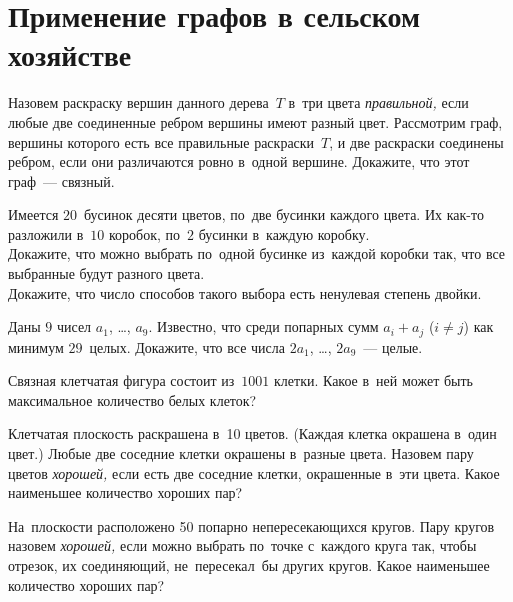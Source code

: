 
\section*{Применение графов в сельском хозяйстве}


\begin{problems}

\item
Назовем раскраску вершин данного дерева~$T$ в~три цвета \emph{правильной,}
если любые две соединенные ребром вершины имеют разный цвет.
Рассмотрим граф, вершины которого есть все правильные раскраски~$T$, и две
раскраски соединены ребром, если они различаются ровно в~одной вершине.
Докажите, что этот граф~--- связный.

\item
Имеется $20$~бусинок десяти цветов, по~две бусинки каждого цвета.
Их как-то разложили в~$10$ коробок, по~$2$ бусинки в~каждую коробку.
\\
\subproblem
Докажите, что можно выбрать по~одной бусинке из~каждой коробки так, что все
выбранные будут разного цвета.
\\
\subproblem
Докажите, что число способов такого выбора есть ненулевая степень двойки.

\item
Даны $9$ чисел $a_{1}$, \ldots, $a_{9}$.
Известно, что среди попарных сумм $a_{i} + a_{j}$ ($i \neq j$) как минимум
$29$~целых.
Докажите, что все числа $2 a_{1}$, \ldots, $2 a_{9}$~--- целые.

\item
Связная клетчатая фигура состоит из~$1001$ клетки.
Какое в~ней может быть максимальное количество белых клеток?

\item
Клетчатая плоскость раскрашена в~10 цветов.
(Каждая клетка окрашена в~один цвет.)
Любые две соседние клетки окрашены в~разные цвета.
Назовем пару цветов \emph{хорошей,} если есть две соседние клетки, окрашенные
в~эти цвета.
Какое наименьшее количество хороших пар?

\item
На~плоскости расположено 50 попарно непересекающихся кругов.
Пару кругов назовем \emph{хорошей,} если можно выбрать по~точке с~каждого круга
так, чтобы отрезок, их соединяющий, не~пересекал~бы других кругов.
Какое наименьшее количество хороших пар?


\end{problems}
